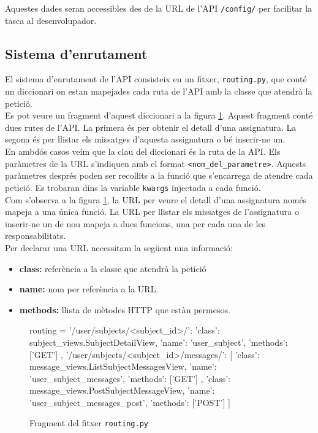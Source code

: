 Aquestes dades seran accessibles des de la \ac{URL} de l'\ac{API} \texttt{/config/} per facilitar la tasca al desenvolupador.

\subsection{Sistema d'enrutament}

El sistema d'enrutament de l'\ac{API} consisteix en un fitxer, \texttt{routing.py}, que conté un diccionari on estan mapejades cada ruta de l'\ac{API} amb la classe que atendrà la petició.\\

Es pot veure un fragment d'aquest diccionari a la figura \ref{fig:routing}. Aquest fragment conté dues rutes de l'\ac{API}. La primera és per obtenir el detall d'una assignatura. La segona és per llistar els missatges d'aquesta assignatura o bé inserir-ne un.\\

En ambdós casos veim que la clau del diccionari és la ruta de la \ac{API}. Els paràmetres de la \ac{URL} s'indiquen amb el format \texttt{<nom\_del\_parametre>}. Aquests paràmetres després poden ser recollits a la funció que s'encarrega de atendre cada petició. Es trobaran dins la variable \texttt{kwargs} injectada a cada funció. \\

Com s'observa a la figura \ref{fig:routing}, la \ac{URL} per veure el detall d'una assignatura només mapeja a una única funció. La \ac{URL} per llistar els missatges de l'assignatura o inserir-ne un de nou mapeja a dues funcions, una per cada una de les responsabilitats.\\

Per declarar una \ac{URL} necessitam la següent una informació:

\begin{itemize}
	\item \textbf{class:} referència a la classe que atendrà la petició
	\item \textbf{name:} nom per referència a la \ac{URL}.
	\item \textbf{methods:} llista de mètodes \ac{HTTP} que estàn permesos.
\end{itemize}

\begin{figure}[h!]
	\begin{python}
routing = {
	'/user/subjects/<subject_id>/': {
		'class': subject_views.SubjectDetailView,
		'name': 'user_subject',
		'methods': ['GET']
	},
	'/user/subjects/<subject_id>/messages/': [
		{
			'class': message_views.ListSubjectMessagesView,
			'name': 'user_subject_messages',
			'methods': ['GET']
		},
		{
			'class': message_views.PostSubjectMessageView,
			'name': 'user_subject_messages_post',
			'methods': ['POST']
		}
	]
}
	\end{python}
	\caption{Fragment del fitxer \texttt{routing.py}}
	\label{fig:routing}
\end{figure}

